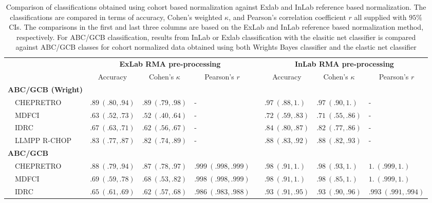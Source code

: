 \begin{table}[!tbp]
\begin{adjustwidth}{-1in}{0in}
{\scriptsize
\caption{Comparison of classifications obtained using cohort based
normalization against Exlab and InLab reference based normalization.
The classifications are compared in terms of accuracy,
Cohen's weighted $\kappa$, and Pearson's correlation coefficient $r$ all
supplied with $95\%$ CIs. The comparisons in the first and last three columns
are based on the ExLab and InLab reference based
normalization method, respectively. For ABC/GCB classification, results
from InLab or Exlab classification with the elasitic net classifier is 
compared against ABC/GCB classes for cohort normalized data obtained using both
Wrights Bayes classifier and the elastic net classifier\label{tab:classALL}} 
\begin{center}
\begin{tabular}{llllclll}
\hline\hline
\multicolumn{1}{l}{\bfseries }&\multicolumn{3}{c}{\bfseries ExLab RMA pre-processing}&\multicolumn{1}{c}{\bfseries }&\multicolumn{3}{c}{\bfseries InLab RMA pre-processing}\tabularnewline
\cline{2-4} \cline{6-8}
\multicolumn{1}{l}{}&\multicolumn{1}{c}{Accuracy}&\multicolumn{1}{c}{Cohen's $\kappa$}&\multicolumn{1}{c}{Pearson's $r$}&\multicolumn{1}{c}{}&\multicolumn{1}{c}{Accuracy}&\multicolumn{1}{c}{Cohen's $\kappa$}&\multicolumn{1}{c}{Pearson's $r$}\tabularnewline
\hline
{\bfseries ABC/GCB (Wright)}&&&&&&&\tabularnewline
~~CHEPRETRO&$.89~(.80, .94)$&$.89~(.79, .98)$&-&&$.97~(.88, 1.)$&$.97~(.90, 1.)$&-\tabularnewline
~~MDFCI&$.63~(.52, .73)$&$.52~(.40, .64)$&-&&$.72~(.59, .83)$&$.71~(.55, .86)$&-\tabularnewline
~~IDRC&$.67~(.63, .71)$&$.62~(.56, .67)$&-&&$.84~(.80, .87)$&$.82~(.77, .86)$&-\tabularnewline
~~LLMPP R-CHOP&$.83~(.77, .87)$&$.82~(.74, .89)$&-&&$.88~(.83, .92)$&$.88~(.82, .93)$&-\tabularnewline
\hline
{\bfseries ABC/GCB}&&&&&&&\tabularnewline
~~CHEPRETRO&$.88~(.79, .94)$&$.87~(.78, .97)$&$.999~(.998, .999)$&&$.98~(.91, 1.)$&$.98~(.93, 1.)$&$1.~(.999, 1.)$\tabularnewline
~~MDFCI&$.69~(.59, .78)$&$.68~(.53, .82)$&$.998~(.998, .999)$&&$.98~(.91, 1.)$&$.98~(.85, 1.)$&$1.~(.999, 1.)$\tabularnewline
~~IDRC&$.65~(.61, .69)$&$.62~(.57, .68)$&$.986~(.983, .988)$&&$.93~(.91, .95)$&$.93~(.90, .96)$&$.993~(.991, .994)$\tabularnewline

\end{tabular}
\end{center}}
\end{adjustwidth}
\end{table}
